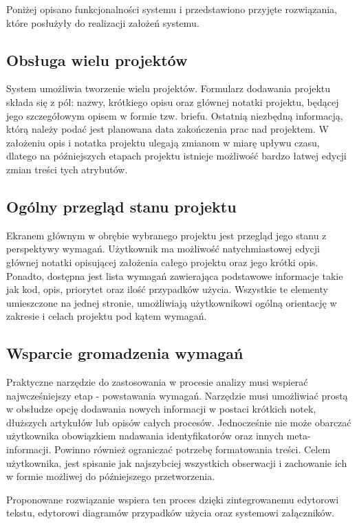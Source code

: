     Poniżej opisano funkcjonalności systemu i przedstawiono przyjęte rozwiązania, które posłużyły do realizacji założeń systemu.

    \subsection{Obsługa wielu projektów} 
      System umożliwia tworzenie wielu projektów. Formularz dodawania projektu składa się z pól: nazwy, krótkiego opisu oraz głównej notatki projektu, będącej jego szczegółowym opisem w formie tzw. briefu. Ostatnią niezbędną informacją, którą należy podać jest planowana data zakończenia prac nad projektem. W założeniu opis i notatka projektu ulegają zmianom w miarę upływu czasu, dlatego na późniejszych etapach projektu istnieje możliwość bardzo łatwej edycji zmian treści tych atrybutów. 

    \subsection{Ogólny przegląd stanu projektu}
      Ekranem głównym w obrębie wybranego projektu jest przegląd jego stanu z perspektywy wymagań. Użytkownik ma możliwość natychmiastowej edycji głównej notatki opisującej założenia całego projektu oraz jego krótki opis. Ponadto, dostępna jest lista wymagań zawierająca podstawowe informacje takie jak kod, opis, priorytet oraz ilość przypadków użycia. Wszystkie te elementy umieszczone na jednej stronie, umożliwiają użytkownikowi ogólną orientację w zakresie i celach projektu pod kątem wymagań. 

    \subsection{Wsparcie gromadzenia wymagań}
      Praktyczne narzędzie do zastosowania w procesie analizy musi wspierać najwcześniejszy etap - powstawania wymagań. Narzędzie musi umożliwiać prostą w obsłudze opcję dodawania nowych informacji w postaci krótkich notek, dłuższych artykułów lub opisów całych procesów. Jednocześnie nie może obarczać użytkownika obowiązkiem nadawania identyfikatorów oraz innych meta-informacji. Powinno również ograniczać potrzebę formatowania treści. Celem użytkownika, jest spisanie jak najszybciej wszystkich obserwacji i zachowanie ich w formie możliwej do późniejszego przetworzenia.

      Proponowane rozwiązanie wspiera ten proces dzięki zintegrowanemu edytorowi tekstu, edytorowi diagramów przypadków użycia oraz systemowi załączników.
      

